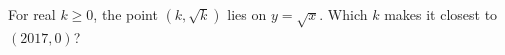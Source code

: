 For real $ k\ge0 $, the point $(k,\sqrt{k})$ lies on $ y=\sqrt{x}$. Which $ k $ makes it closest to $(2017,0)$?
